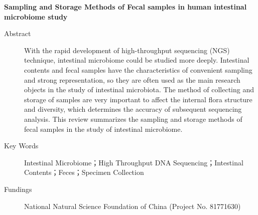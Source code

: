 \begin{englishabstract}
  \textbf{Sampling and Storage Methods of Fecal samples in human intestinal microbiome study}
    \begin{description}
      \item[Abstract]With the rapid development of high-throughput sequencing (NGS) technique, intestinal microbiome could be studied more deeply. Intestinal contents and fecal samples have the characteristics of convenient sampling and strong representation, so they are often used as the main research objects in the study of intestinal microbiota. The method of collecting and storage of samples are very important to affect the internal flora structure and diversity, which determines the accuracy of subsequent sequencing analysis. This review summarizes the sampling and storage methods of fecal samples in the study of intestinal microbiome.
      \item[Key Words]Intestinal Microbiome；High Throughput DNA Sequencing；Intestinal Contents；Feces；Specimen Collection
      \item[Fundings]National Natural Science Foundation of China (Project No. 81771630)
    \end{description}


\end{englishabstract}
